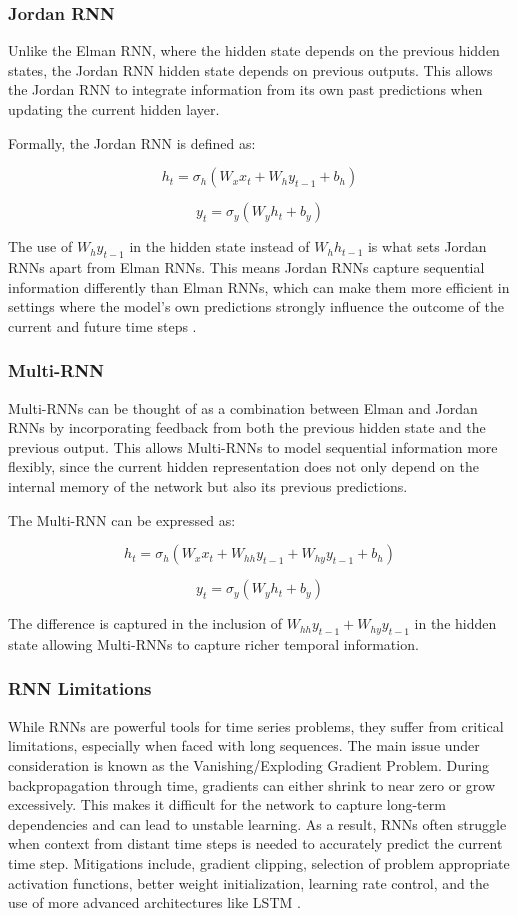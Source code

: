 \documentclass[conference]{IEEEtran}
\begin{document}
\subsubsection{\textbf{Jordan RNN}}

Unlike the Elman RNN, where the hidden state depends on the previous hidden states, the Jordan RNN hidden state depends on previous outputs. This allows the Jordan RNN to integrate information from its own past predictions when updating the current hidden layer.

Formally, the Jordan RNN is defined as:

$$
h_t = \sigma_h(W_x x_t + W_h y_{t-1} + b_h)
$$

$$
y_t = \sigma_y(W_y h_t + b_y)
$$

The use of $W_h y_{t-1}$ in the hidden state instead of $W_h h_{t-1}$ is what sets Jordan RNNs apart from Elman RNNs. This means Jordan RNNs capture sequential information differently than Elman RNNs, which can make them more efficient in settings where the model's own predictions strongly influence the outcome of the current and future time steps \cite{jordan_rnn}.

\subsubsection{\textbf{Multi-RNN}}

Multi-RNNs can be thought of as a combination between Elman and Jordan RNNs by incorporating feedback from both the previous hidden state and the previous output. This allows Multi-RNNs to model sequential information more flexibly, since the current hidden representation does not only depend on the internal memory of the network but also its previous predictions.

The Multi-RNN can be expressed as:

$$
h_t = \sigma_h(W_x x_t + W_{hh} y_{t-1} + W_{hy} y_{t-1} + b_h)
$$

$$
y_t = \sigma_y(W_y h_t + b_y)
$$

The difference is captured in the inclusion of $W_{hh} y_{t-1} + W_{hy} y_{t-1}$ in the hidden state allowing Multi-RNNs to capture richer temporal information.

\subsubsection{\textbf{RNN Limitations}}

While RNNs are powerful tools for time series problems, they suffer from critical limitations, especially when faced with long sequences. The main issue under consideration is known as the Vanishing/Exploding Gradient Problem. During backpropagation through time, gradients can either shrink to near zero or grow excessively. This makes it difficult for the network to capture long-term dependencies and can lead to unstable learning. As a result, RNNs often struggle when context from distant time steps is needed to accurately predict the current time step. Mitigations include, gradient clipping, selection of problem appropriate activation functions, better weight initialization, learning rate control, and the use of more advanced architectures like LSTM \cite{rnn_problems}. 
\end{document}
